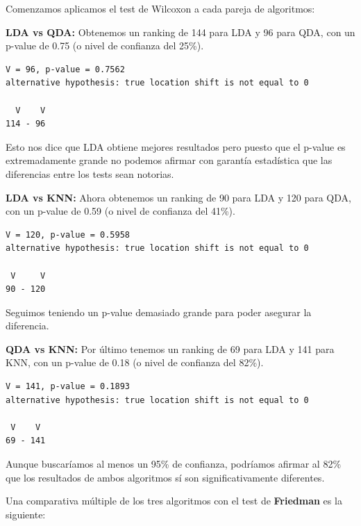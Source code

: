 \vspace{\baselineskip}
\vspace{\baselineskip}

Comenzamos aplicamos el test de Wilcoxon a cada pareja de algoritmos:

\vspace{\baselineskip}

\textbf{LDA vs QDA:} Obtenemos un ranking de 144 para LDA y 96 para QDA, con un p-value de 0.75 (o nivel de confianza del 25\%).
\begin{verbatim}
V = 96, p-value = 0.7562
alternative hypothesis: true location shift is not equal to 0

  V    V
114 - 96 
\end{verbatim}

Esto nos dice que LDA obtiene mejores resultados pero puesto que el p-value es extremadamente grande no podemos afirmar con garantía estadística que las diferencias entre los tests sean notorias.

\newpage

\textbf{LDA vs KNN:} Ahora obtenemos un ranking de 90 para LDA y 120 para QDA, con un p-value de 0.59 (o nivel de confianza del 41\%).
\begin{verbatim}
V = 120, p-value = 0.5958
alternative hypothesis: true location shift is not equal to 0

 V     V
90 - 120 
\end{verbatim}

Seguimos teniendo un p-value demasiado grande para poder asegurar la diferencia.

\vspace{\baselineskip}

\textbf{QDA vs KNN:} Por último tenemos un ranking de 69 para LDA y 141 para KNN, con un p-value de 0.18 (o nivel de confianza del 82\%).
\begin{verbatim}
V = 141, p-value = 0.1893
alternative hypothesis: true location shift is not equal to 0

 V    V
69 - 141
\end{verbatim}

Aunque buscaríamos al menos un 95\% de confianza, podríamos afirmar al 82\% que los resultados de ambos algoritmos sí son significativamente diferentes.

\vspace{\baselineskip}
\vspace{\baselineskip}

Una comparativa múltiple de los tres algoritmos con el test de \textbf{Friedman} es la siguiente:

